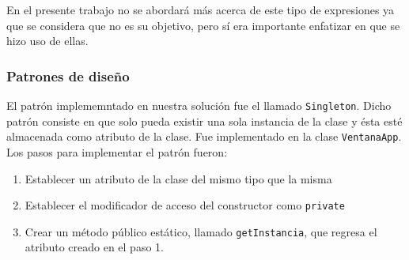 En el presente trabajo no se abordará más acerca de este tipo de expresiones ya que se considera que no es su objetivo, pero sí era 
importante enfatizar en que se hizo uso de ellas.

\subsubsection*{Patrones de diseño}
El patrón implememntado en nuestra solución fue el llamado \texttt{Singleton}. Dicho patrón consiste en que solo pueda existir una sola
instancia de la clase y ésta esté almacenada como atributo de la clase. Fue implementado en la clase \texttt{VentanaApp}. Los pasos para implementar el patrón fueron:

\begin{enumerate}
    \item Establecer un atributo de la clase del mismo tipo que la misma
    \item Establecer el modificador de acceso del constructor como \texttt{private}
    \item Crear un método público estático, llamado \texttt{getInstancia}, que regresa el atributo creado en el paso 1.
\end{enumerate}

\pagebreak